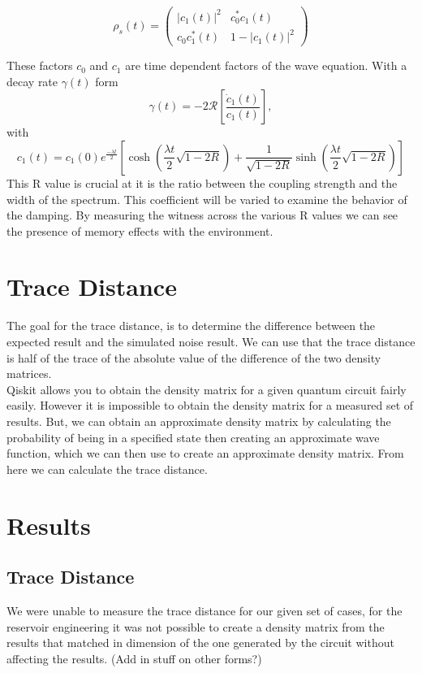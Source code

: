 \documentclass[12pt]{article}
\begin{document}
  \begin{equation}
    \rho_{s}(t) = \begin{pmatrix}
        \lvert c_{1}(t)\rvert^2 & c_{0}^{*}c_{1}(t) \\
        c_{0}c_{1}^{*}(t) & 1 - \lvert c_{1}(t)\rvert^2 
    \end{pmatrix}
  \end{equation}

  These factors $c_{0}$ and $c_{1}$ are time dependent factors of the wave equation. With a decay rate $\gamma(t)$ form
  \begin{equation}
    \gamma(t) = -2\mathcal{R} \left[ \frac{\dot{c}_{1}(t)}{c_{1}(t)} \right],
  \end{equation}
  with 
  \begin{equation}
    c_{1}(t) = c_{1}(0)e^{\frac{-\lambda t}{2}} \left[ \cosh (\frac{\lambda t}{2} \sqrt{1 - 2R}) + \frac{1}{\sqrt{1 - 2R}} \sinh (\frac{\lambda t}{2} \sqrt{1 - 2R}) \right]
  \end{equation}
  This R value is crucial at it is the ratio between the coupling strength and the width of the spectrum. This coefficient will be varied to examine the behavior of the damping. By measuring the witness across the various R values we can see the presence of memory effects with the environment.


\section{Trace Distance}
        The goal for the trace distance, is to determine the difference between the expected result and the simulated noise result. We can use that the trace distance is half of the trace of the absolute value of the difference of the two density matrices. \\
        Qiskit allows you to obtain the density matrix for a given quantum circuit fairly easily. However it is impossible to obtain the density matrix for a measured set of results. But, we can obtain an approximate density matrix by calculating the probability of being in a specified state then creating an approximate wave function, which we can then use to create an approximate density matrix. From here we can calculate the trace distance.  

  \section{Results}
  \subsection{Trace Distance}
        We were unable to measure the trace distance for our given set of cases, for the reservoir engineering it was not possible to create a density matrix from the results that matched in dimension of the one generated by the circuit without affecting the results. (Add in stuff on other forms?)
\end{document}
